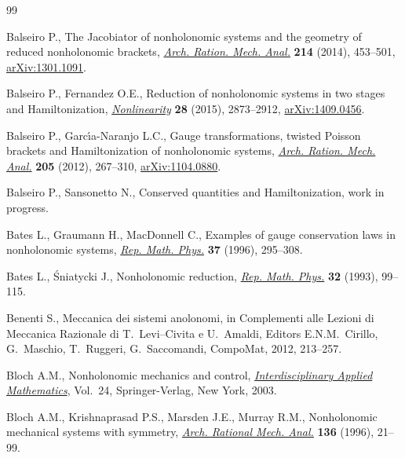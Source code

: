 \documentclass[pdftex]{sigma}
\numberwithin{equation}{section}
\begin{document}
\begin{thebibliography}{99}
\footnotesize\itemsep=0pt

Balseiro P., The {J}acobiator of nonholonomic systems and the geometry of
  reduced nonholonomic brackets, \href{http://dx.doi.org/10.1007/s00205-014-0759-4}{\textit{Arch. Ration. Mech. Anal.}}
  \textbf{214} (2014), 453--501, \href{http://arxiv.org/abs/1301.1091}{arXiv:1301.1091}.

Balseiro P., Fernandez O.E., Reduction of nonholonomic systems in two stages
  and {H}amiltonization, \href{http://dx.doi.org/10.1088/0951-7715/28/8/2873}{\textit{Nonlinearity}} \textbf{28} (2015), 2873--2912,
  \href{http://arxiv.org/abs/1409.0456}{arXiv:1409.0456}.

Balseiro P., Garc{\'{\i}}a-Naranjo L.C., Gauge transformations, twisted
  {P}oisson brackets and {H}amiltonization of nonholonomic systems,
  \href{http://dx.doi.org/10.1007/s00205-012-0512-9}{\textit{Arch. Ration. Mech. Anal.}} \textbf{205} (2012), 267--310,
  \href{http://arxiv.org/abs/1104.0880}{arXiv:1104.0880}.

Balseiro P., Sansonetto N., Conserved quantities and {H}amiltonization, {w}ork in progress.

Bates L., Graumann H., MacDonnell C., Examples of gauge conservation laws in
  nonholonomic systems, \href{http://dx.doi.org/10.1016/0034-4877(96)84069-9}{\textit{Rep. Math. Phys.}} \textbf{37} (1996), 295--308.

Bates L., {\'S}niatycki J., Nonholonomic reduction, \href{http://dx.doi.org/10.1016/0034-4877(93)90073-N}{\textit{Rep. Math. Phys.}}
  \textbf{32} (1993), 99--115.

Benenti S., Meccanica dei sistemi anolonomi, in Complementi alle Lezioni di
  Meccanica Razionale di T.~Levi--Civita e U.~Amaldi, Editors E.N.M.~Cirillo,
  G.~Maschio, T.~Ruggeri, G.~Saccomandi, CompoMat, 2012, 213--257.

Bloch A.M., Nonholonomic mechanics and control, \href{http://dx.doi.org/10.1007/b97376}{\textit{Interdisciplinary
  Applied Mathematics}}, Vol.~24, Springer-Verlag, New York, 2003.

Bloch A.M., Krishnaprasad P.S., Marsden J.E., Murray R.M., Nonholonomic
  mechanical systems with symmetry, \href{http://dx.doi.org/10.1007/BF02199365}{\textit{Arch. Rational Mech. Anal.}}
  \textbf{136} (1996), 21--99.


\end{thebibliography}
\end{document}
